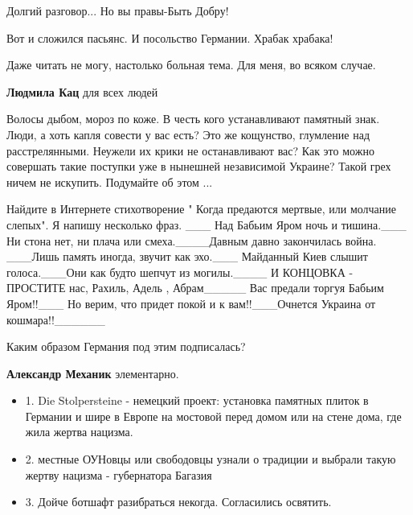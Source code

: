 \begin{itemize}
\begin{itemize}
Долгий разговор... Но вы правы-Быть Добру!

\end{itemize} %

Вот и сложился пасьянс. И посольство Германии. Храбак храбака!

Даже читать не могу, настолько больная тема. Для меня, во всяком случае.

\begin{itemize} %
\textbf{Людмила Кац} для всех людей
\end{itemize} %


Волосы дыбом, мороз по коже. В честь кого устанавливают памятный знак. Люди, а
хоть капля совести у вас есть? Это же кощунство, глумление над расстрелянными.
Неужели их крики не останавливают вас? Как это можно совершать такие поступки
уже в нынешней независимой Украине? Такой грех ничем не искупить. Подумайте об
этом ...


Найдите в Интернете стихотворение " Когда предаются мертвые, или молчание
слепых". Я напишу несколько фраз. \_\_\_ Над Бабьим Яром ночь и тишина.\_\_\_ Ни
стона нет, ни плача или смеха.\_\_\_\_Давным давно закончилась война. \_\_\_Лишь
память иногда, звучит как эхо.\_\_\_ Майданный Киев слышит голоса.\_\_\_Они как будто
шепчут из могилы.\_\_\_\_ И КОНЦОВКА - ПРОСТИТЕ нас, Рахиль, Адель ,
Абрам\_\_\_\_\_ Вас предали торгуя Бабьим Яром!!\_\_\_ Но верим, что придет покой и к
вам!!\_\_\_Очнется Украина от кошмара!!\_\_\_\_\_\_

Каким образом Германия под этим подписалась?

\begin{itemize} %
\textbf{Александр Механик} элементарно.

\begin{itemize} %
\item 1. Die Stolpersteine - немецкий проект: установка памятных плиток в Германии и шире в Европе на мостовой перед домом или на стене дома, где жила жертва нацизма.

\item 2. местные ОУНовцы или свободовцы узнали о традиции и выбрали такую жертву нацизма - губернатора Багазия

\item 3. Дойче ботшафт разибраться некогда. Согласились освятить.
\end{itemize} %


\end{itemize}
\end{itemize}
